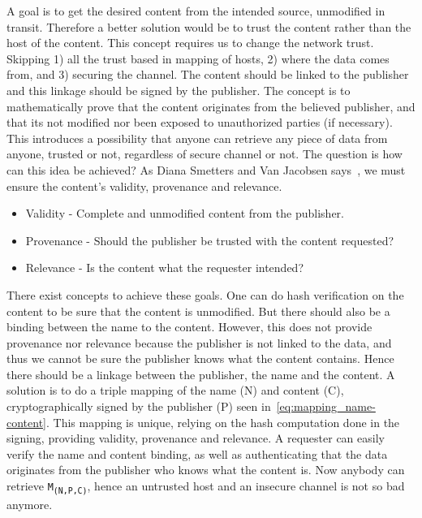 A goal is to get the desired content from the intended source, unmodified in transit.
Therefore a better solution would be to trust the content rather than the \gls{host} of the content.
This concept requires us to change the network trust.
Skipping 1) all the trust based in mapping of hosts, 2) where the data comes from, and 3) securing the channel.
The content should be linked to the \gls{publisher} and this linkage should be signed by the \gls{publisher}. 
The concept is to mathematically prove that the content originates from the believed \gls{publisher}, and that its not modified nor been exposed to unauthorized parties (if necessary).
This introduces a possibility that anyone can retrieve any piece of data from anyone, trusted or not, regardless of secure channel or not.
The question is how can this idea be achieved? 
As Diana Smetters and Van Jacobsen says~\cite{secure-network-content}, we must ensure the content's validity, provenance and relevance.

\begin{itemize}
  \item Validity - Complete and unmodified content from the \gls{publisher}.
  \item Provenance - Should the \gls{publisher} be trusted with the content requested?
  \item Relevance - Is the content what the requester intended?
\end{itemize}

There exist concepts to achieve these goals.
One can do hash verification on the content to be sure that the content is unmodified. 
But there should also be a binding between the \gls{name} to the content.
However, this does not provide provenance nor relevance because the \gls{publisher} is not linked to the data, and thus we cannot be sure the \gls{publisher} knows what the content contains.
Hence there should be a linkage between the \gls{publisher}, the \gls{name} and the content.
A solution is to do a triple mapping of the \gls{name} (N) and content (C), cryptographically signed by the \gls{publisher} (P) seen in~\autoref{eq:mapping_name-content}.
This mapping is unique, relying on the hash computation done in the signing, providing validity, provenance and relevance.
A requester can easily verify the \gls{name} and content binding, as well as authenticating that the data originates from the \gls{publisher} who knows what the content is.
Now anybody can retrieve \texttt{M\textsubscript{(N,P,C)}}, hence an untrusted \gls{host} and an insecure channel is not so bad anymore.

